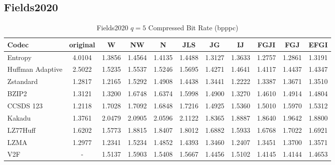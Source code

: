 \documentclass{article}
\begin{document}
\subsection{Fields2020}
\begin{table}[h!]
\centering
\caption{Fields2020 $q=5$ Compressed Bit Rate (bpppc)}
\begin{tabular}{|l|cccccccccc|}
\hline
Codec &  original &      W &     NW &      N &    JLS &     JG &     IJ &   FGJI &    FGJ &   EFGI \\
\hline
Entropy & 4.0104 & 1.3856 & 1.4564 & 1.4135 & 1.4488 & 1.3127 & 1.3633 & 1.2757 & 1.2861 & 1.3191 \\
\hline
Huffman Adaptive &    2.5022 & 1.5235 & 1.5537 & 1.5246 & 1.5695 & 1.4271 & 1.4641 & 1.4117 & 1.4437 & 1.4347 \\
Zstandard        &    1.2817 & 1.2165 & 1.5292 & 1.4908 & 1.4438 & 1.3441 & 1.2222 & 1.3387 & 1.3671 & 1.3510 \\
BZIP2            &    1.3121 & 1.3200 & 1.6748 & 1.6374 & 1.5998 & 1.4900 & 1.3270 & 1.4610 & 1.4914 & 1.4804 \\
CCSDS 123        &    1.2118 & 1.7028 & 1.7092 & 1.6848 & 1.7216 & 1.4925 & 1.5360 & 1.5010 & 1.5970 & 1.5312 \\
Kakadu           &    1.3761 & 2.0479 & 2.0905 & 2.0596 & 2.1122 & 1.8365 & 1.8887 & 1.8640 & 1.9642 & 1.8800 \\
LZ77Huff         &    1.6202 & 1.5773 & 1.8815 & 1.8407 & 1.8012 & 1.6882 & 1.5933 & 1.6768 & 1.7022 & 1.6921 \\
LZMA             &    1.2977 & 1.2341 & 1.5234 & 1.4852 & 1.4393 & 1.3460 & 1.2407 & 1.3451 & 1.3700 & 1.3571 \\
V2F              &   - & 1.5137 & 1.5903 & 1.5408 & 1.5667 & 1.4456 & 1.5102 & 1.4145 & 1.4144 & 1.4653 \\
\hline
\end{tabular}
\end{table}
\end{document}
